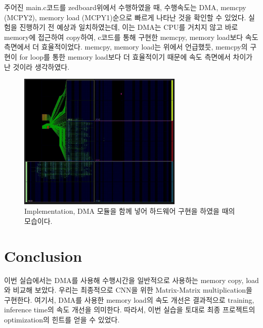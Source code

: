 \documentclass{article}
\begin{document}
주어진 main.c코드를 zedboard위에서 수행하였을 때, 수행속도는 DMA, memcpy (MCPY2), memory load (MCPY1)순으로 빠르게 나타난 것을 확인할 수 있었다. 실험을 진행하기 전 예상과 일치하였는데, 이는 DMA는 CPU를 거치지 않고 바로 memory에 접근하여 copy하여, c코드를 통해 구현한 memcpy, memory load보다 속도 측면에서 더 효율적이었다.
memcpy, memory load는 위에서 언급했듯, memcpy의 구현이 for loop를 통한 memory load보다 더 효율적이기 때문에 속도 측면에서 차이가 난 것이라 생각하였다.

\begin{figure}[htb!]
	\centering
	\includegraphics[width=0.7\textwidth]{fig/implementation.jpg}
\caption{Implementation, DMA 모듈을 함께 넣어 하드웨어 구현을 하였을 때의 모습이다.}
\label{fig7}
\end{figure}

\section{Conclusion}
이번 실습에서는 DMA를 사용해 수행시간을 일반적으로 사용하는 memory copy, load와 비교해 보았다.
우리는 최종적으로 CNN을 위한 Matrix-Matrix multiplication을 구현한다. 여기서, DMA를 사용한 memory load의 속도 개선은 결과적으로 training, inference time의 속도 개선을 의미한다. 따라서, 이번 실습을 토대로 최종 프로젝트의 optimization의 힌트를 얻을 수 있었다.



\end{document}
